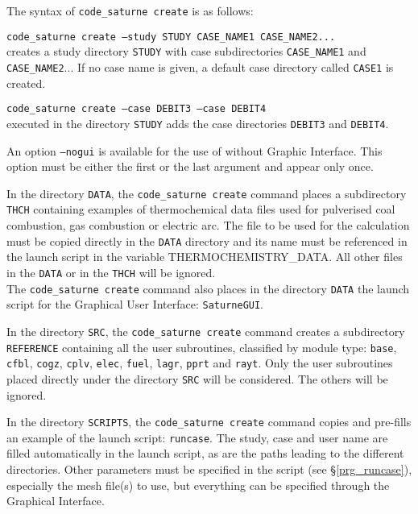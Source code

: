 {{{The syntax of \texttt{code\_saturne~create} is as follows:

\noindent
\texttt{code\_saturne~create --study STUDY CASE\_NAME1 CASE\_NAME2...}\\
creates a study directory \texttt{STUDY} with case subdirectories
\texttt{CASE\_NAME1} and \texttt{CASE\_NAME2}...
If no case name is given, a default case directory called \texttt{CASE1} is
created.

\noindent
\texttt{code\_saturne~create --case DEBIT3 --case DEBIT4}\\
executed in the directory \texttt{STUDY} adds the case directories
\texttt{DEBIT3} and \texttt{DEBIT4}.

An option \texttt{--nogui} is available for the use of \CS
without Graphic Interface. This option must
be either the first or the last argument and appear only once.

In the directory \texttt{DATA}, the \texttt{code\_saturne~create} command
places a subdirectory \texttt{THCH} containing examples of thermochemical data
files used for pulverised coal combustion,
gas combustion or electric arc. The file to be used for the calculation must be
copied directly in the \texttt{DATA} directory and its name must be referenced
in the launch script in the variable THERMOCHEMISTRY\_DATA. All other files in
the \texttt{DATA} or in the \texttt{THCH} will be ignored.\\
The \texttt{code\_saturne~create} command also places in the directory
\texttt{DATA} the launch script for the Graphical User Interface:
\texttt{SaturneGUI}.


In the directory \texttt{SRC}, the \texttt{code\_saturne~create} command creates a
subdirectory \texttt{REFERENCE} containing all the user subroutines,
classified by module type:  \texttt{base},
\texttt{cfbl}, \texttt{cogz}, \texttt{cplv}, \texttt{elec}, \texttt{fuel},
\texttt{lagr}, \texttt{pprt} and \texttt{rayt}.
Only the user subroutines placed directly under
the directory \texttt{SRC} will be considered. The others will be ignored.

In the directory \texttt{SCRIPTS}, the \texttt{code\_saturne~create} command copies and
pre-fills an example of the launch script: \texttt{runcase}.
The study, case and user name are filled
automatically in the launch script, as are the paths leading to the
different directories. Other parameters must be specified in the script
(see \S\ref{prg_runcase}),
especially the mesh file(s) to use, but everything can be specified
through the Graphical Interface.

}}}
